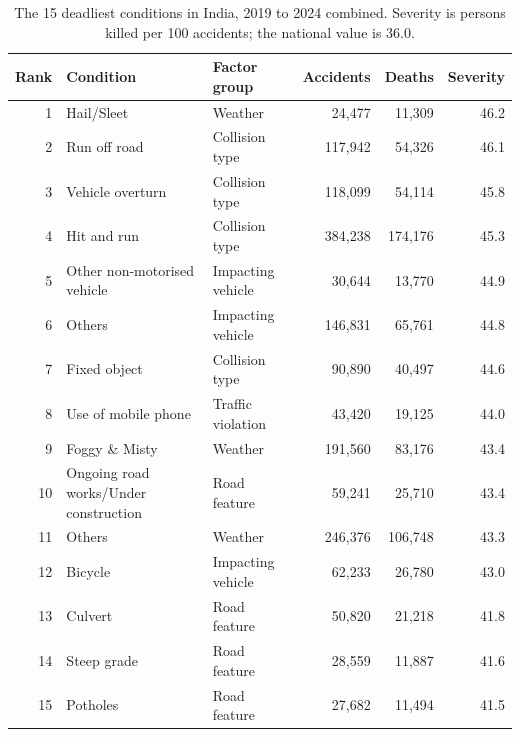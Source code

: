 \begin{table}[t]
\caption{The 15 deadliest conditions in India, 2019 to 2024 combined. Severity is persons killed per 100 accidents; the national value is 36.0.}
\label{tab:deadliest_conditions}
\begin{tabular}{rllrrr}
\toprule
Rank & Condition & Factor group & Accidents & Deaths & Severity \\
\midrule
1 & Hail/Sleet & Weather & 24{,}477 & 11{,}309 & 46.2 \\
2 & Run off road & Collision type & 117{,}942 & 54{,}326 & 46.1 \\
3 & Vehicle overturn & Collision type & 118{,}099 & 54{,}114 & 45.8 \\
4 & Hit and run & Collision type & 384{,}238 & 174{,}176 & 45.3 \\
5 & Other non-motorised vehicle & Impacting vehicle & 30{,}644 & 13{,}770 & 44.9 \\
6 & Others & Impacting vehicle & 146{,}831 & 65{,}761 & 44.8 \\
7 & Fixed object & Collision type & 90{,}890 & 40{,}497 & 44.6 \\
8 & Use of mobile phone & Traffic violation & 43{,}420 & 19{,}125 & 44.0 \\
9 & Foggy \& Misty & Weather & 191{,}560 & 83{,}176 & 43.4 \\
10 & Ongoing road works/Under construction & Road feature & 59{,}241 & 25{,}710 & 43.4 \\
11 & Others & Weather & 246{,}376 & 106{,}748 & 43.3 \\
12 & Bicycle & Impacting vehicle & 62{,}233 & 26{,}780 & 43.0 \\
13 & Culvert & Road feature & 50{,}820 & 21{,}218 & 41.8 \\
14 & Steep grade & Road feature & 28{,}559 & 11{,}887 & 41.6 \\
15 & Potholes & Road feature & 27{,}682 & 11{,}494 & 41.5 \\
\bottomrule
\end{tabular}
\end{table}
